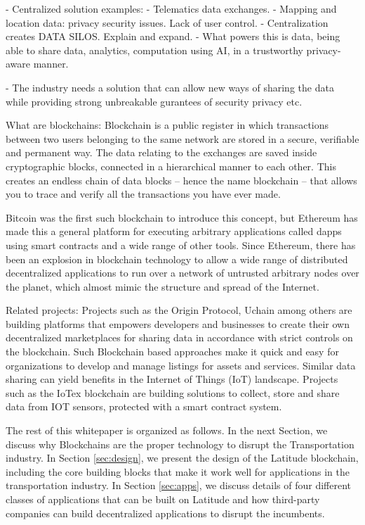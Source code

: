 - Centralized solution examples:
    - Telematics data exchanges.
    - Mapping and location data: privacy security issues. Lack of user control.
    - Centralization creates DATA SILOS. Explain and expand.
- What powers this is data, being able to share data, analytics, computation using AI, in a trustworthy privacy-aware
manner.

- The industry needs a solution that can allow new ways of sharing the data while providing strong unbreakable gurantees
of security privacy etc.

\noindent
{\textsf What are blockchains:}
Blockchain is a public register in which transactions between two users belonging to the same network are stored in a secure, verifiable
and permanent way. The data relating to the exchanges are saved inside cryptographic blocks, connected in a hierarchical
manner to each other. This creates an endless chain of data blocks -- hence the name blockchain -- that allows you to
trace and verify all the transactions you have ever made.

Bitcoin was the first such blockchain to introduce this concept, but Ethereum has made this a general platform for
executing arbitrary applications called dapps using smart contracts and a wide range of other tools. Since Ethereum,
there has been an explosion in blockchain technology to allow a wide range of distributed decentralized applications to
run over a network of untrusted arbitrary nodes over the planet, which almost mimic the structure and spread of the
Internet.

\noindent
{\textsf Related projects:}
Projects such as the Origin Protocol, Uchain among others are building platforms that empowers developers and businesses
to create their own decentralized marketplaces for sharing data in accordance with strict controls on the blockchain.
Such Blockchain based approaches make it quick and easy for organizations to develop and manage listings for assets and
services. Similar data sharing can yield benefits in the Internet of Things (IoT) landscape. Projects such as the IoTex
blockchain are building solutions to collect, store and share data from IOT sensors, protected with a smart contract
system.

The rest of this whitepaper is organized as follows. In the next Section, we discuss why Blockchains are the proper
technology to disrupt the Transportation industry. In Section \ref{sec:design}, we present the design of the Latitude
blockchain, including the core building blocks that make it work well for applications in the transportation industry.
In Section \ref{sec:apps}, we discuss details of four different classes of applications that can be built on Latitude
and how third-party companies can build decentralized applications to disrupt the incumbents.

